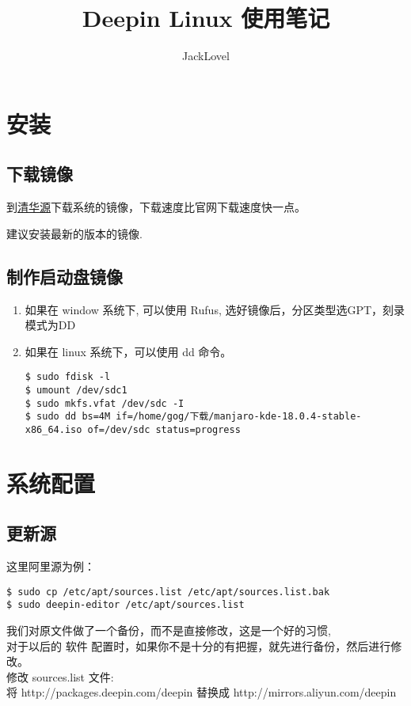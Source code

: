 \documentclass[UTF8]{ctexart}
\title{Deepin Linux 使用笔记}
\author{JackLovel}
\begin{document}
\maketitle
\newpage
\tableofcontents
\newpage
\section{安装}
\subsection{下载镜像}
到\href{https://mirrors.tuna.tsinghua.edu.cn/deepin-cd/}{清华源}下载系统的镜像，下载速度比官网下载速度快一点。

建议安装最新的版本的镜像.
\subsection{制作启动盘镜像}
\flushleft
\begin{enumerate}
\item 如果在 window 系统下, 可以使用 Rufus, 选好镜像后，分区类型选GPT，刻录模式为DD
\item 如果在 linux 系统下，可以使用 dd 命令。
\begin{lstlisting}
$ sudo fdisk -l 
$ umount /dev/sdc1
$ sudo mkfs.vfat /dev/sdc -I
$ sudo dd bs=4M if=/home/gog/下载/manjaro-kde-18.0.4-stable-x86_64.iso of=/dev/sdc status=progress
\end{lstlisting}

\end{enumerate}

\section{系统配置}
\subsection{更新源}
这里阿里源为例：
\begin{lstlisting}
$ sudo cp /etc/apt/sources.list /etc/apt/sources.list.bak  
$ sudo deepin-editor /etc/apt/sources.list
\end{lstlisting}
我们对原文件做了一个备份，而不是直接修改，这是一个好的习惯,\\
对于以后的 软件 配置时，如果你不是十分的有把握，就先进行备份，然后进行修改。\\


修改 sources.list 文件: \\
将 http://packages.deepin.com/deepin 替换成 http://mirrors.aliyun.com/deepin
\end{document}
